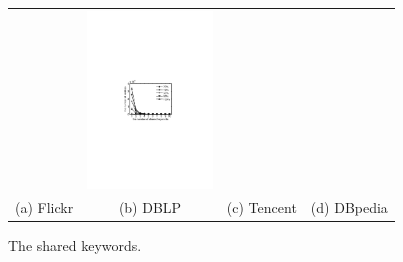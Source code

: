 \begin{figure}[htb]
\begin{tabular}{c c c c}
\begin{minipage}{3.36cm}
  \end{minipage}
  &
  \begin{minipage}{3.36cm}
	\includegraphics[width=3.325cm]{figures/dbpedia-share}
  \end{minipage}
  \\
  \small (a) Flickr
  &
  \small (b) DBLP
  &
  \small (c) Tencent
  &
  \small (d) DBpedia
\end{tabular}
\caption{The shared keywords.}
\label{fig:exp-more-dec}
\end{figure}

